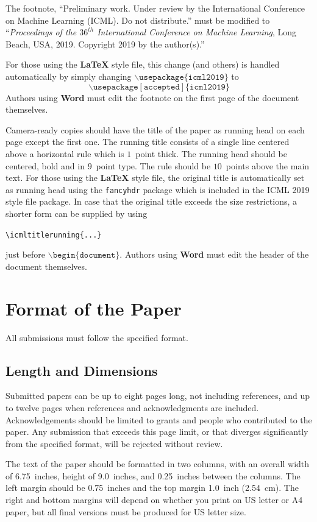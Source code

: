 \documentclass{article}
\begin{document}
The footnote, ``Preliminary work. Under review by the International
Conference on Machine Learning (ICML). Do not distribute.'' must be
modified to ``\textit{Proceedings of the
$\mathit{36}^{th}$ International Conference on Machine Learning},
Long Beach, USA, 2019.
Copyright 2019 by the author(s).''

For those using the \textbf{\LaTeX} style file, this change (and others) is
handled automatically by simply changing
$\mathtt{\backslash usepackage\{icml2019\}}$ to
$$\mathtt{\backslash usepackage[accepted]\{icml2019\}}$$
Authors using \textbf{Word} must edit the
footnote on the first page of the document themselves.

Camera-ready copies should have the title of the paper as running head
on each page except the first one. The running title consists of a
single line centered above a horizontal rule which is $1$~point thick.
The running head should be centered, bold and in $9$~point type. The
rule should be $10$~points above the main text. For those using the
\textbf{\LaTeX} style file, the original title is automatically set as running
head using the \texttt{fancyhdr} package which is included in the ICML
2019 style file package. In case that the original title exceeds the
size restrictions, a shorter form can be supplied by using

\verb|\icmltitlerunning{...}|

just before $\mathtt{\backslash begin\{document\}}$.
Authors using \textbf{Word} must edit the header of the document themselves.

\section{Format of the Paper}

All submissions must follow the specified format.

\subsection{Length and Dimensions}

Submitted papers can be up to eight pages long, not including references, and up to twelve pages when references and acknowledgments are included.
Acknowledgements should be limited to grants and people who contributed to the paper.
Any submission that exceeds
this page limit, or that diverges significantly from the specified format,
will be rejected without review.

The text of the paper should be formatted in two columns, with an
overall width of 6.75~inches, height of 9.0~inches, and 0.25~inches
between the columns. The left margin should be 0.75~inches and the top
margin 1.0~inch (2.54~cm). The right and bottom margins will depend on
whether you print on US letter or A4 paper, but all final versions
must be produced for US letter size.
\end{document}
